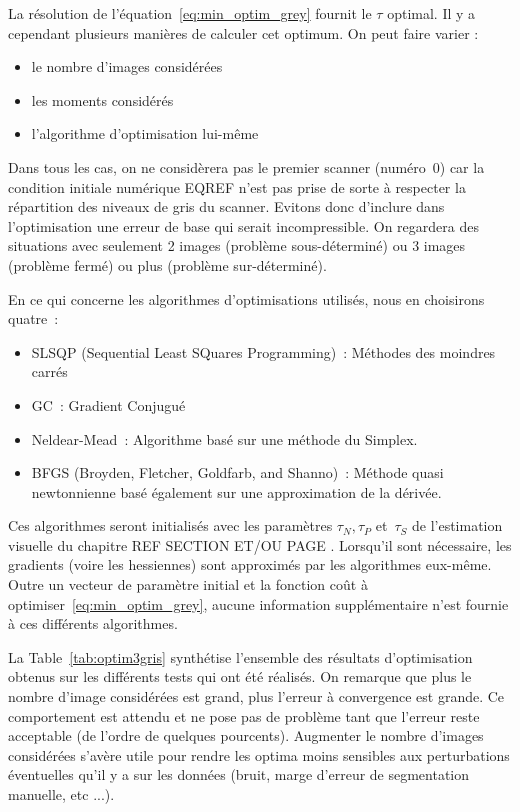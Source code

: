 \documentclass[main.tex]{subfiles}
\begin{document}
La résolution de l'équation~\eqref{eq:min_optim_grey} fournit le $\tau$ optimal. Il y a cependant plusieurs manières de calculer cet optimum. On peut  faire varier :
\begin{itemize}
\item le nombre d'images considérées
\item les moments considérés
\item l'algorithme d'optimisation lui-même
\end{itemize}

Dans tous les cas, on ne considèrera pas le premier scanner (numéro~0) car la condition initiale numérique EQREF  n'est pas prise de sorte à respecter la répartition des niveaux de gris du scanner. Evitons donc d'inclure dans l'optimisation une erreur de base qui serait incompressible. On regardera des situations avec seulement 2 images (problème sous-déterminé) ou 3 images (problème fermé) ou plus (problème sur-déterminé).

En ce qui concerne les algorithmes d'optimisations utilisés, nous en choisirons quatre~:
\begin{itemize}
\item SLSQP (Sequential Least SQuares Programming)~: Méthodes des moindres carrés 
\item GC~: Gradient Conjugué
\item Neldear-Mead~: Algorithme basé sur une méthode du Simplex.
\item BFGS (Broyden, Fletcher, Goldfarb, and Shanno)~: Méthode quasi newtonnienne basé également sur une approximation de la dérivée.
\end{itemize}
Ces algorithmes seront initialisés avec les paramètres $\tau_N, \tau_P$ et~$\tau_S$ de l'estimation visuelle du chapitre REF SECTION ET/OU PAGE . Lorsqu'il sont nécessaire, les gradients (voire les hessiennes) sont approximés par les algorithmes eux-même. Outre un vecteur de paramètre initial et la fonction coût à optimiser~\ref{eq:min_optim_grey}, aucune information supplémentaire n'est fournie à ces différents algorithmes.




La Table~\ref{tab:optim3gris} synthétise l'ensemble des résultats d'optimisation obtenus sur les différents tests qui ont été réalisés. 
On remarque que plus le nombre d'image considérées est grand, plus l'erreur à convergence est grande. Ce comportement est attendu et ne pose pas de problème tant que l'erreur reste acceptable (de l'ordre de quelques pourcents). Augmenter le nombre d'images considérées s'avère utile pour rendre les optima moins sensibles aux perturbations éventuelles qu'il y a sur les données (bruit, marge d'erreur de segmentation manuelle, etc ...).
\end{document}
